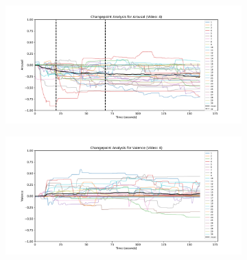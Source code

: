 \documentclass[11pt, letterpaper]{article}
\begin{document}
\begin{figure}
        \centering
    \begin{subfigure}[t]{0.49\textwidth}
        \centering
        \includegraphics[width=\linewidth]{changepoints_V4_arousal_avg_all_data} 
        \caption{} \label{fig:changepoints_V4_arousal_avg_all_datal}
    \end{subfigure}
    \hfill
    \begin{subfigure}[t]{0.49\textwidth}
        \centering
        \includegraphics[width=\linewidth]{changepoints_V4_valence_avg_all_data} 
        \caption{} \label{fig:changepoints_V4_valence_avg_all_data}
    \end{subfigure}
 \end{figure}
\end{document}
